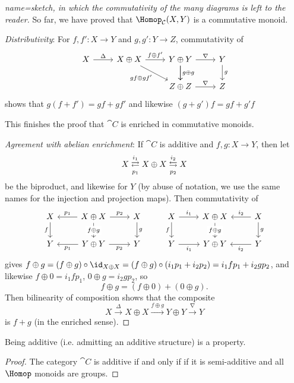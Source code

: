 \documentclass[../main.tex]{subfiles}
\begin{document}
\begin{proof}[name={sketch, in which the commutativity of the many diagrams is left to the reader}]
So far, we have proved that $\Hom_{\cat C}(X,Y)$ is a commutative monoid.

\emph{Distributivity}: For $f,f'\colon X \to Y$ and $g,g'\colon Y  \to Z$, commutativity of 
\[\begin{tikzcd}
  X & {X\oplus X} & {Y\oplus Y} \ar[d, "g\oplus g"] & Y \\
  && {Z\oplus Z} & Z
  \arrow["{gf\oplus gf'}"', from=1-2, to=2-3]
  \arrow[from=1-3, to=2-3]
  \arrow["\nabla", from=1-3, to=1-4]
  \arrow["g", from=1-4, to=2-4]
  \arrow["\nabla", from=2-3, to=2-4]
  \arrow["{f\oplus f'}", from=1-2, to=1-3]
  \arrow["\Delta", from=1-1, to=1-2]
\end{tikzcd}\]
shows that $g(f+ f') = gf + gf'$ and likewise $(g + g')f = gf + g'f$

This finishes the proof that \(\cat C\) is enriched in commutative monoids.

\emph{Agreement with abelian enrichment}: If $\cat C$ is additive and $f,g\colon X \to Y$, then let
  \[
      X \xrightleftarrows{i_1}[p_1] X \oplus X \xleftrightarrows{i_2}[p_2] X
    \] be the biproduct, and likewise for $Y$ (by abuse of notation, we use the same names for the injection and projection maps). Then commutativity of
\[\begin{tikzcd}
  X & {X\oplus X} & X & X & {X\oplus X} & X \\
  Y & {Y\oplus Y} & Y & Y & {Y\oplus Y} & Y
  \arrow["f"', from=1-1, to=2-1]
  \arrow["{p_1}"', to=1-1, from=1-2]
  \arrow["{p_2}", from=1-2, to=1-3]
  \arrow["g", from=1-3, to=2-3]
  \arrow["{p_2}"', from=2-2, to=2-3]
  \arrow["p_1", from=2-2, to=2-1]
  \arrow["{f\oplus g}"{description}, from=1-2, to=2-2]
  \arrow["f"', from=1-4, to=2-4]
  \arrow["{i_1}"', from=2-4, to=2-5]
  \arrow["{i_1}", from=1-4, to=1-5]
  \arrow["{i_2}"', from=1-6, to=1-5]
  \arrow["{i_2}", from=2-6, to=2-5]
  \arrow["g", from=1-6, to=2-6]
  \arrow["{f\oplus g}" description, from=1-5, to=2-5]
\end{tikzcd}\]
gives $f \oplus g = (f \oplus g) \circ \id_{X \oplus X} = (f \oplus g) \circ (i_1 p_1 + i_2 p_2) = i_1 f p_1 + i_2 g p_2$, and likewise $f \oplus 0 = i_1 f p_1$, $0 \oplus g = i_2 g p_2$, so \[
      f \oplus g = (f \oplus 0) + (0 \oplus g).
    \] Then bilinearity of composition shows that the composite
  \[
      X \xrightarrow{\Delta} X \oplus X \xrightarrow{f \oplus g} Y \oplus Y \xrightarrow{\nabla} Y
    \] is $f + g$ (in the enriched sense).
\end{proof}
\begin{cor}
  Being additive (i.e. admitting an additive structure) is a property.
\end{cor}
\begin{proof}
  The category $\cat C$ is additive if and only if if it is semi-additive and all $\Hom$ monoids are groups.
\end{proof}
\end{document}

